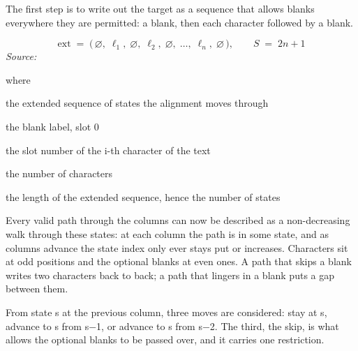 The first step is to write out the target as a sequence that allows blanks everywhere they are permitted: a blank, then each character followed by a blank.


\begin{equation}
\mathrm{ext} \;=\; \big(\,\varnothing,\; \ell_1,\; \varnothing,\; \ell_2,\; \varnothing,\; \dots,\; \ell_n,\; \varnothing \,\big), \qquad S \;=\; 2n+1
\end{equation}
\noindent\emph{Source: }\cite{graves2006}


\noindent where
\begin{description}[leftmargin=2.4em,style=nextline,font=\normalfont\ttfamily]\setlength\itemsep{1pt}
  \item[{$\mathrm{ext}$}] \normalfont the extended sequence of states the alignment moves through
  \item[{$\varnothing$}] \normalfont the blank label, slot 0
  \item[{$\ell_i$}] \normalfont the slot number of the i-th character of the text
  \item[{$n$}] \normalfont the number of characters
  \item[{$S$}] \normalfont the length of the extended sequence, hence the number of states
\end{description}
Every valid path through the columns can now be described as a non-decreasing walk through these states: at each column the path is in some state, and as columns advance the state index only ever stays put or increases. Characters sit at odd positions and the optional blanks at even ones. A path that skips a blank writes two characters back to back; a path that lingers in a blank puts a gap between them.


From state s at the previous column, three moves are considered: stay at s, advance to s from s$-$1, or advance to s from s$-$2. The third, the skip, is what allows the optional blanks to be passed over, and it carries one restriction.


